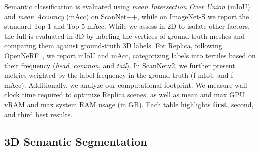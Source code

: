 Semantic classification is evaluated using \emph{mean Intersection Over Union} (mIoU) and \emph{mean Accuracy} (mAcc) on ScanNet++, while on ImageNet-S we report the standard Top-1 and Top-5 mAcc. While we assess \clipours in 2D to isolate other factors, the full \ours is evaluated in 3D by labeling the vertices of ground-truth meshes and comparing them against ground-truth 3D labels.
For Replica, following OpenNeRF~\cite{engelmann2024opennerf}, we report mIoU and mAcc, categorizing labels into tertiles based on their frequency (\emph{head}, \emph{common}, and \emph{tail}). 
In ScanNetv2, we further present metrics weighted by the label frequency in the ground truth (f-mIoU and f-mAcc).
Additionally, we analyze our computational footprint.
We measure wall-clock time required to optimize Replica scenes, as well as mean and max GPU vRAM and max system RAM usage (in GB).
Each table highlights \colorbox{Green!25}{\textbf{first}}, \colorbox{SpringGreen!45}{second}, and \colorbox{Yellow!30}{third} best results.

\subsection{3D Semantic Segmentation}
\label{sec:sem_seg_exp}
%

